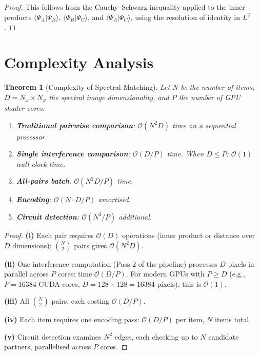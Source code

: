 \documentclass[11pt,twocolumn,a4paper]{article}
\newtheorem{theorem}{Theorem}[section]
\newcommand{\BigO}{\mathcal{O}}
\begin{document}
\begin{proof}
This follows from the Cauchy--Schwarz inequality applied to the inner
products $\langle\Psi_A|\Psi_B\rangle$,
$\langle\Psi_B|\Psi_C\rangle$, and $\langle\Psi_A|\Psi_C\rangle$,
using the resolution of identity in $L^2$ \citep{meyer2000}.
\end{proof}


\section{Complexity Analysis}
\label{sec:complexity}

\begin{theorem}[Complexity of Spectral Matching]
\label{thm:complexity}
Let $N$ be the number of items, $D = N_\omega \times N_\varphi$ the
spectral image dimensionality, and $P$ the number of GPU shader cores.
\begin{enumerate}[label=(\roman*),nosep]
  \item \textbf{Traditional pairwise comparison}: $\BigO(N^2 D)$ time
    on a sequential processor.
  \item \textbf{Single interference comparison}: $\BigO(D/P)$ time.
    When $D \leq P$: $\BigO(1)$ wall-clock time.
  \item \textbf{All-pairs batch}: $\BigO(N^2 D / P)$ time.
  \item \textbf{Encoding}: $\BigO(N \cdot D / P)$ amortised.
  \item \textbf{Circuit detection}: $\BigO(N^3 / P)$ additional.
\end{enumerate}
\end{theorem}

\begin{proof}
\textbf{(i)} Each pair requires $\BigO(D)$ operations (inner product or
distance over $D$ dimensions); $\binom{N}{2}$ pairs gives $\BigO(N^2 D)$.

\textbf{(ii)} One interference computation (Pass 2 of the pipeline)
processes $D$ pixels in parallel across $P$ cores: time $\BigO(D/P)$.
For modern GPUs with $P \geq D$ (e.g., $P = 16384$ CUDA cores,
$D = 128 \times 128 = 16384$ pixels), this is $\BigO(1)$.

\textbf{(iii)} All $\binom{N}{2}$ pairs, each costing $\BigO(D/P)$.

\textbf{(iv)} Each item requires one encoding pass: $\BigO(D/P)$ per
item, $N$ items total.

\textbf{(v)} Circuit detection examines $N^2$ edges, each checking up
to $N$ candidate partners, parallelised across $P$ cores.
\end{proof}
\end{document}
